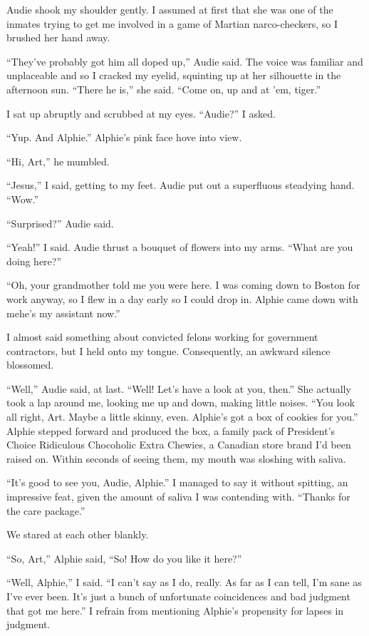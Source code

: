 Audie shook my shoulder gently. I assumed at first that she was one
of the inmates trying to get me involved in a game of Martian
narco-checkers, so I brushed her hand away.

“They’ve probably got him all doped up,” Audie said. The voice was
familiar and unplaceable and so I cracked my eyelid, squinting up
at her silhouette in the afternoon sun. “There he is,” she said.
“Come on, up and at ’em, tiger.”

I sat up abruptly and scrubbed at my eyes. “Audie?” I asked.

“Yup. And Alphie.” Alphie’s pink face hove into view.

“Hi, Art,” he mumbled.

“Jesus,” I said, getting to my feet. Audie put out a superfluous
steadying hand. “Wow.”

“Surprised?” Audie said.

“Yeah!” I said. Audie thrust a bouquet of flowers into my arms.
“What are you doing here?”

“Oh, your grandmother told me you were here. I was coming down to
Boston for work anyway, so I flew in a day early so I could drop
in. Alphie came down with me{\dash}he’s my assistant now.”

I almost said something about convicted felons working for
government contractors, but I held onto my tongue. Consequently, an
awkward silence blossomed.

“Well,” Audie said, at last. “Well! Let’s have a look at you,
then.” She actually took a lap around me, looking me up and down,
making little noises. “You look all right, Art. Maybe a little
skinny, even. Alphie’s got a box of cookies for you.” Alphie
stepped forward and produced the box, a family pack of President’s
Choice Ridiculous Chocoholic Extra Chewies, a Canadian store brand
I’d been raised on. Within seconds of seeing them, my mouth was
sloshing with saliva.

“It’s good to see you, Audie, Alphie.” I managed to say it without
spitting, an impressive feat, given the amount of saliva I was
contending with. “Thanks for the care package.”

We stared at each other blankly.

“So, Art,” Alphie said, “So! How do you like it here?”

“Well, Alphie,” I said. “I can’t say as I do, really. As far as I
can tell, I’m sane as I’ve ever been. It’s just a bunch of
unfortunate coincidences and bad judgment that got me here.” I
refrain from mentioning Alphie’s propensity for lapses in
judgment.

